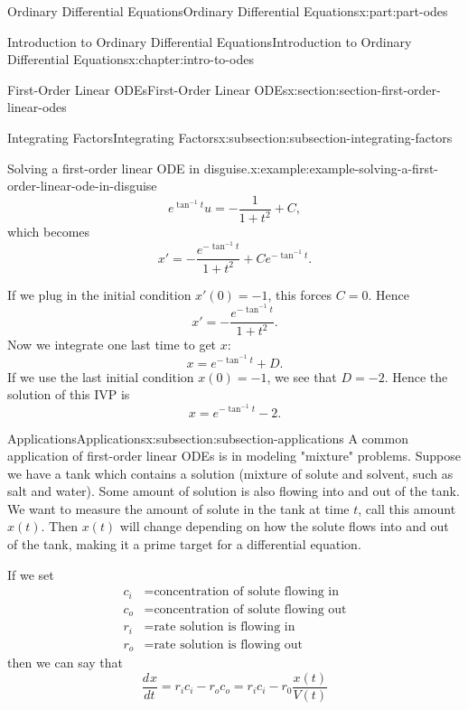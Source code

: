 \documentclass[oneside,10pt,]{book}
\numberwithin{equation}{part}
\newcommand{\dv}[3][]{\dfrac{d^{#1} #2}{d #3^{#1}}}
\begin{document}
\begin{partptx}{Ordinary Differential Equations}{}{Ordinary Differential Equations}{}{}{x:part:part-odes}
\begin{chapterptx}{Introduction to Ordinary Differential Equations}{}{Introduction to Ordinary Differential Equations}{}{}{x:chapter:intro-to-odes}
\begin{sectionptx}{First-Order Linear ODEs}{}{First-Order Linear ODEs}{}{}{x:section:section-first-order-linear-odes}
\begin{subsectionptx}{Integrating Factors}{}{Integrating Factors}{}{}{x:subsection:subsection-integrating-factors}
\begin{example}{Solving a first-order linear ODE in disguise.}{x:example:example-solving-a-first-order-linear-ode-in-disguise}
\begin{equation*}
e^{\tan^{-1}t}u = -\frac{1}{1+t^{2}}+C,
\end{equation*}
which becomes%
\begin{equation*}
x' = -\frac{e^{-\tan^{-1}t}}{1+t^{2}}+Ce^{-\tan^{-1}t}.
\end{equation*}
%
\par
If we plug in the initial condition \(x'(0) = -1\), this forces \(C=0\). Hence%
\begin{equation*}
x' = -\frac{e^{-\tan^{-1}t}}{1+t^{2}}.
\end{equation*}
Now we integrate one last time to get \(x\):%
\begin{equation*}
x = e^{-\tan^{-1}t}+D.
\end{equation*}
If we use the last initial condition \(x(0)=-1\), we see that \(D = -2\). Hence the solution of this IVP is%
\begin{equation*}
x = e^{-\tan^{-1}t}-2.
\end{equation*}
%
\end{example}
\end{subsectionptx}
%
%
\typeout{************************************************}
\typeout{************************************************}
%
\begin{subsectionptx}{Applications}{}{Applications}{}{}{x:subsection:subsection-applications}
A common application of first-order linear ODEs is in modeling "mixture" problems. Suppose we have a tank which contains a solution (mixture of solute and solvent, such as salt and water). Some amount of solution is also flowing into and out of the tank. We want to measure the amount of solute in the tank at time \(t\), call this amount \(x(t)\). Then \(x(t)\) will change depending on how the solute flows into and out of the tank, making it a prime target for a differential equation.%
\par
If we set%
\begin{align*}
c_{i} & =\text{concentration of solute flowing in} \\
c_{o} & =\text{concentration of solute flowing out} \\
r_{i} & =\text{rate solution is flowing in} \\
r_{o} & = \text{rate solution is flowing out} 
\end{align*}
then we can say that%
\begin{equation*}
\dv{x}{t} = r_{i}c_{i} - r_{o}c_{o} = r_{i}c_{i} - r_{0}\frac{x(t)}{V(t)}
\end{equation*}

\end{subsectionptx}
\end{sectionptx}
\end{chapterptx}
\end{partptx}
\end{document}
